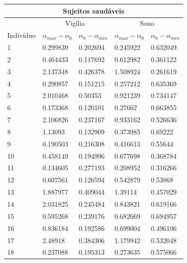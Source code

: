 \documentclass{ufscThesis}
\begin{document}
\begin{table}[h]
\centering
\begin{tabular}{|l|l|l|l|l|}
\hline
\multicolumn{5}{|c|}{Sujeitos saudáveis}                                         \\ \hline
    & \multicolumn{2}{c|}{Vigília} & \multicolumn{2}{c|}{Sono}    \\ \hline
Indivíduo & $\alpha_{max} - \alpha_{0}$ & $\alpha_{0} - \alpha_{min}$ & $\alpha_{max} - \alpha_{0}$ & $\alpha_{0} - \alpha_{min}$ \\ \hline
1   & 0.299839      & 0.202694      & 0.245922     & 0.632049      \\ \hline
2   & 0.464433      & 0.117692      & 0.612982     & 0.361122      \\ \hline
3   & 2.137348      & 0.426378      & 1.508924     & 0.261619      \\ \hline
4   & 0.290857      & 0.151215      & 0.257212     & 0.635369      \\ \hline
5   & 2.010468      & 0.50353       & 0.921239     & 0.734147      \\ \hline
6   & 0.173368      & 0.120101      & 0.27662      & 0.663855      \\ \hline
7   & 2.106826      & 0.237167      & 0.933162     & 0.526636      \\ \hline
8   & 1.13093       & 0.132909      & 0.373985     & 0.69222       \\ \hline
9   & 0.190503      & 0.216308      & 0.416613     & 0.55644       \\ \hline
10  & 0.458149      & 0.194996      & 0.677698     & 0.368784      \\ \hline
11  & 0.134605      & 0.277193      & 0.208952     & 0.316266      \\ \hline
12  & 0.607561      & 0.126594      & 0.542879     & 0.53868       \\ \hline
13  & 1.887977      & 0.409044      & 1.39114      & 0.457029      \\ \hline
14  & 2.031825      & 0.245484      & 0.843821     & 0.619166      \\ \hline
15  & 0.595268      & 0.239176      & 0.682669     & 0.694957      \\ \hline
16  & 0.836184      & 0.192586      & 0.699004     & 0.496106      \\ \hline
17  & 2.48918       & 0.384306      & 1.179942     & 0.532048      \\ \hline
18  & 0.237088      & 0.195313      & 0.273635     & 0.575066      \\ \hline

\end{tabular}
\end{table}
\end{document}
